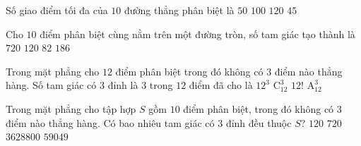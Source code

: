 

\begin{ex}%
	Số giao điểm tối đa của  $10$ đường thẳng phân biệt là
	\choice 
		{$50$} 
		 {$100$}
		 {$120$}
		{\True $45$} 
\end{ex}

\begin{ex}%
	Cho $10$ điểm phân biệt cùng nằm trên một đường tròn, số tam  giác tạo thành là
	 \choice
		{$720$} 
		{\True  $120$}
		{$82$} 
		{$186$} 
\end{ex}

\begin{ex}%
	Trong mặt phẳng cho $12$ điểm  phân biệt trong đó không có $3$ điểm nào thẳng hàng. Số tam giác có $3$ đỉnh là $3$ trong $12$ điểm đã cho là
	 \choice
		{$12^3$} 
		 {\True $\mathrm{C}_{12}^3$}
		 {$12!$}
		 {$\mathrm{A}_{12}^3$}
\end{ex}

\begin{ex}%
	Trong  mặt phẳng cho tập hợp $S$ gồm $10$ điểm phân biệt, trong đó không có $3$ điểm nào thẳng hàng. Có bao nhiêu tam giác có $3$ đỉnh đều thuộc $S$?
	 \choice
		{\True  $120$}
		 {$720$}
		 {$3628800$}
		{$59049$} 
\end{ex}

